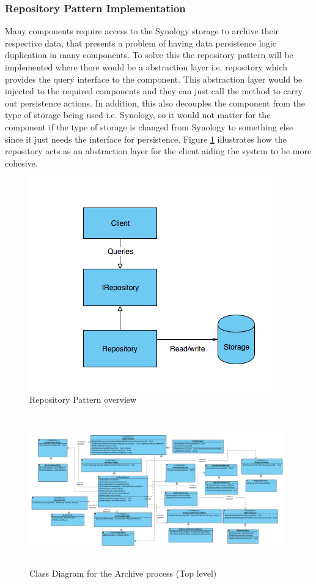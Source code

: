 \subsubsection{Repository Pattern Implementation}
Many components require access to the Synology storage to archive their respective data, that presents a problem of having data
persistence logic duplication in many components. To solve this the repository pattern will be implemented where there would be a abstraction layer i.e. repository which
provides the query interface to the component. This abstraction layer would be injected to the required components and they can just call the 
method to carry out persistence actions. In addition, this also decouples the component from the type of storage being used i.e. Synology, so it would not
matter for the component if the type of storage is changed from Synology to something else since it just needs the interface for persistence. Figure 
\ref{fig:repositoryPattern} illustrates how the repository acts as an abstraction layer for the client aiding the system to be more cohesive. 
\begin{figure}[H]
    \centering \includegraphics[scale=0.7]{grafiken/repositoryPattern.png}
    \caption{Repository Pattern overview}
    \label{fig:repositoryPattern}
\end{figure}


\begin{figure}[H]
    \centering \includegraphics[height=6.5cm, angle=90, origin=c, width=11cm]{grafiken/archiveClass.png}
    \caption{Class Diagram for the Archive process (Top level)}
    \label{fig:archiveClassDiagram}
\end{figure}

